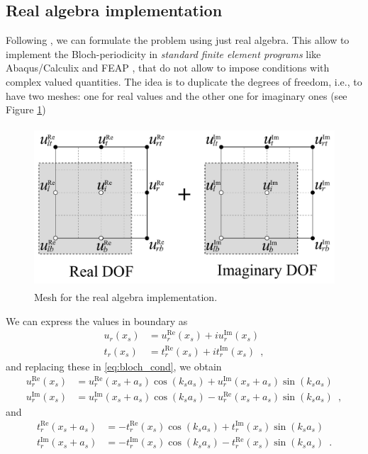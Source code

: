\subsection{Real algebra implementation}
Following \cite{aberg1997}, we can formulate the problem using just real algebra. This allow to implement the Bloch-periodicity in \emph{standard finite element programs} like Abaqus/Calculix and FEAP \cite{feap_manual,Abaqus_manual,Calculix_manual}, that do not allow to impose conditions with complex valued quantities. The idea is to duplicate the degrees of freedom, i.e., to have two meshes: one for real values and the other one for imaginary ones (see Figure \ref{fig:double_mesh_real})
\begin{figure}[h]
\centering
\includegraphics[height=6cm]{cell_FEM-real_algebra.pdf} 
\caption{Mesh for the real algebra implementation.}
\label{fig:double_mesh_real}
\end{figure}

We can express the values in boundary as
\begin{align*}
u_r(x_s) &= u_r^\text{Re}(x_s) + i u_r^\text{Im}(x_s)\\
t_r(x_s) &= t_r^\text{Re}(x_s) + i t_r^\text{Im}(x_s) \enspace ,
\end{align*}
and replacing these in \eqref{eq:bloch_cond}, we obtain
\begin{subequations}
\begin{align}
u_r^\text{Re}(x_s) &= u_r^\text{Re}(x_s + a_s)\cos(k_s a_s) + u_r^\text{Im}(x_s + a_s)\sin(k_s a_s)\\
u_r^\text{Im}(x_s) &= u_r^\text{Im}(x_s + a_s)\cos(k_s a_s) - u_r^\text{Re}(x_s + a_s)\sin(k_s a_s) \enspace ,
\end{align}
\label{eq:real_bloch_disp}
\end{subequations}
and
\begin{subequations}
\begin{align}
t_r^\text{Re}(x_s + a_s) &= -t_r^\text{Re}(x_s)\cos(k_s a_s) + t_r^\text{Im}(x_s)\sin(k_s a_s)\\
t_r^\text{Im}(x_s + a_s) &= -t_r^\text{Im}(x_s)\cos(k_s a_s) - t_r^\text{Re}(x_s)\sin(k_s a_s) \enspace .
\end{align}
\label{eq:real_bloch_trac}
\end{subequations}

